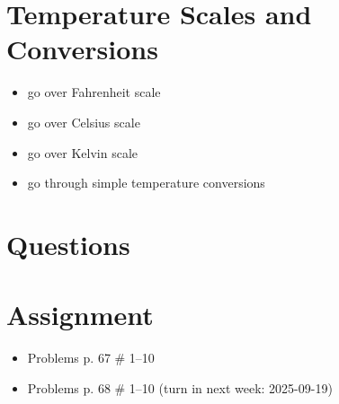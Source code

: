 \documentclass[10pt, oneside]{article}   	%
\begin{document}
\section{Temperature Scales and Conversions}
\begin{itemize}
\item go over Fahrenheit scale
\item go over Celsius scale
\item go over Kelvin scale
\item go through simple temperature conversions
\end{itemize}

\section*{Questions}

\section*{Assignment}
\begin{itemize}
\item Problems p. 67 \# 1--10
\item Problems p. 68 \# 1--10 (turn in next week: 2025-09-19)
\end{itemize}
\end{document}
